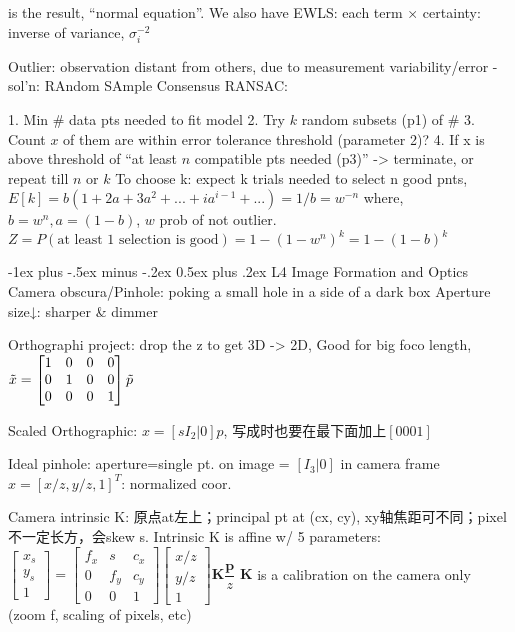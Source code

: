 \documentclass[10pt,landscape]{article}
\makeatletter
\renewcommand{\section}{\@startsection{section}{1}{0mm}%
                                {-1ex plus -.5ex minus -.2ex}%
                                {0.5ex plus .2ex}%
                                {\normalfont\large\bfseries}}
\makeatother
\begin{document}
\begin{multicols}{3}
is the result, “normal equation”. We also have EWLS: each term × certainty: inverse of variance, $\sigma_i^{-2}$

Outlier: observation distant from others, due to measurement variability/error - sol’n: RAndom SAmple Consensus RANSAC:

1. Min \# data pts needed to fit model 
2. Try $k$ random subsets (p1) of \# 
3. Count $x$ of them are within error tolerance threshold (parameter 2)?
4. If x is above threshold of “at least $n$ compatible pts needed (p3)” -> terminate, or repeat till $n$ or $k$
To choose k: expect k trials needed to select n good pnts, $E[k] = b(1 + 2a + 3a^2 + ... + ia^{i-1}+...) = 1/b = w^{-n}$ where, $b = w^n, a = (1-b)$, $w$ prob of not outlier.
$Z = P(\text{at least 1 selection is good})=1- (1-w^n)^k = 1 - (1-b)^k$

\section{L4 Image Formation and Optics}
Camera obscura/Pinhole: poking a small hole in a side of a dark box
Aperture size↓: sharper & dimmer

Orthographi project: drop the z to get 3D -> 2D, Good for big foco length, $\Tilde{x} = \begin{bmatrix} 1 & 0 & 0 & 0 \\ 0 & 1 & 0 & 0 \\ 0 & 0 & 0 & 1\end{bmatrix}\Tilde{p}$

Scaled Orthographic: $x=[sI_2 | 0]p$, 写成时也要在最下面加上$[0 0 0 1]$

Ideal pinhole: aperture=single pt. on image = $[I_3|0]$ in camera frame
$x = [x/z, y/z, 1]^T$: normalized coor.

Camera intrinsic K: 原点at左上；principal pt at (cx, cy), xy轴焦距可不同；pixel不一定长方，会skew s.
Intrinsic K is affine w/ 5 parameters: $\begin{bmatrix} x_s \\ y_s \\ 1\end{bmatrix} = \begin{bmatrix} f_x & s & c_x \\ 0 & f_y & c_y \\ 0 & 0 & 1\end{bmatrix}\begin{bmatrix} x/z \\ y/z \\ 1\end{bmatrix}\mathbf{K}\dfrac{\mathbf{p}}{z}$
$\mathbf{K}$ is a calibration on the camera only (zoom f, scaling of pixels, etc)


\end{multicols}
\end{document}
